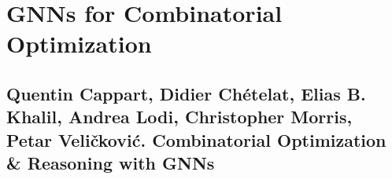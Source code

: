 \documentclass{article}
\begin{document}


\section{GNNs for Combinatorial Optimization}


\subsection{{\sc Quentin Cappart, Didier Ch\'etelat, Elias B. Khalil, Andrea Lodi, Christopher Morris, Petar Veličković}. Combinatorial Optimization \& Reasoning with GNNs}
\end{document}
